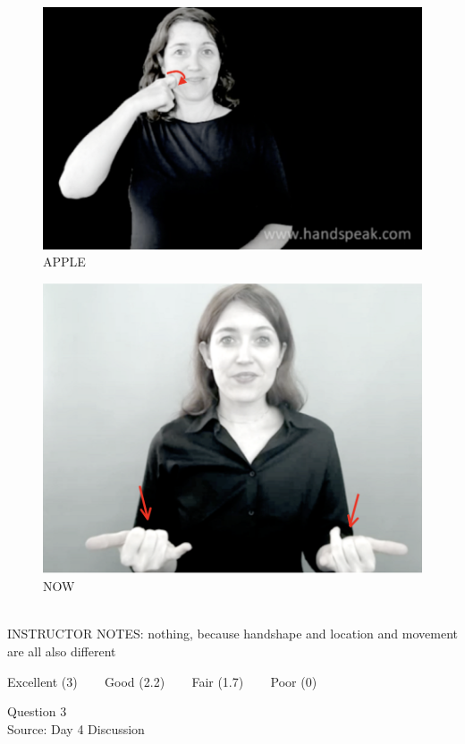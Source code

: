\documentclass[12pt]{article}
\begin{document}
\begin{figure}[H]
\includegraphics{../images/asl_apple.png}
\caption{APPLE}
\end{figure}
\begin{figure}[H]
\includegraphics{../images/asl_now.png}
\caption{NOW}
\end{figure}

~\\
INSTRUCTOR NOTES: nothing, because handshape and location and movement are all also different


\vfill
Excellent (3) ~~~ Good (2.2) ~~~ Fair (1.7) ~~~ Poor (0)
\newpage

{\large Question 3}\\

Source: Day 4 Discussion\\
\end{document}

